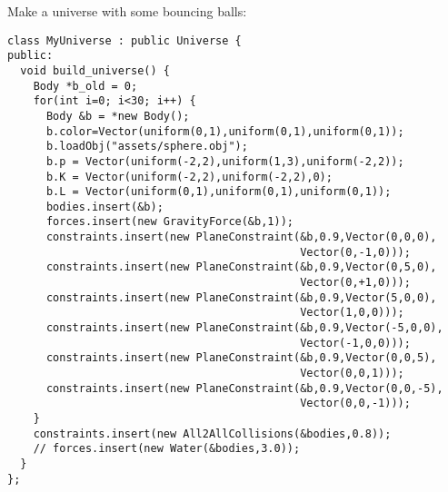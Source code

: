 Make a universe with some bouncing balls: \begin{lstlisting}
class MyUniverse : public Universe {
public:
  void build_universe() {
    Body *b_old = 0;
    for(int i=0; i<30; i++) {
      Body &b = *new Body();
      b.color=Vector(uniform(0,1),uniform(0,1),uniform(0,1));
      b.loadObj("assets/sphere.obj");
      b.p = Vector(uniform(-2,2),uniform(1,3),uniform(-2,2));
      b.K = Vector(uniform(-2,2),uniform(-2,2),0);
      b.L = Vector(uniform(0,1),uniform(0,1),uniform(0,1));
      bodies.insert(&b);
      forces.insert(new GravityForce(&b,1));
      constraints.insert(new PlaneConstraint(&b,0.9,Vector(0,0,0),
                                             Vector(0,-1,0)));
      constraints.insert(new PlaneConstraint(&b,0.9,Vector(0,5,0),
                                             Vector(0,+1,0)));
      constraints.insert(new PlaneConstraint(&b,0.9,Vector(5,0,0),
                                             Vector(1,0,0)));
      constraints.insert(new PlaneConstraint(&b,0.9,Vector(-5,0,0),
                                             Vector(-1,0,0)));
      constraints.insert(new PlaneConstraint(&b,0.9,Vector(0,0,5),
                                             Vector(0,0,1)));
      constraints.insert(new PlaneConstraint(&b,0.9,Vector(0,0,-5),
                                             Vector(0,0,-1)));
    }
    constraints.insert(new All2AllCollisions(&bodies,0.8));
    // forces.insert(new Water(&bodies,3.0));
  }
};
\end{lstlisting}
\noindent
